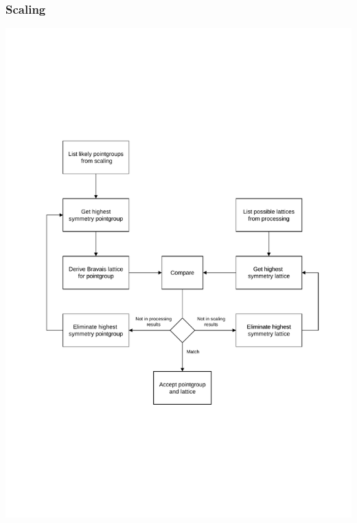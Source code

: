 \documentclass[slides,compress]{beamer}
\begin{document}
\begin{frame}
\frametitle{Scaling}
\hspace{2cm}
\includegraphics[scale=0.5]{figures/scaling-step-1.pdf}
\end{frame}
\end{document}
